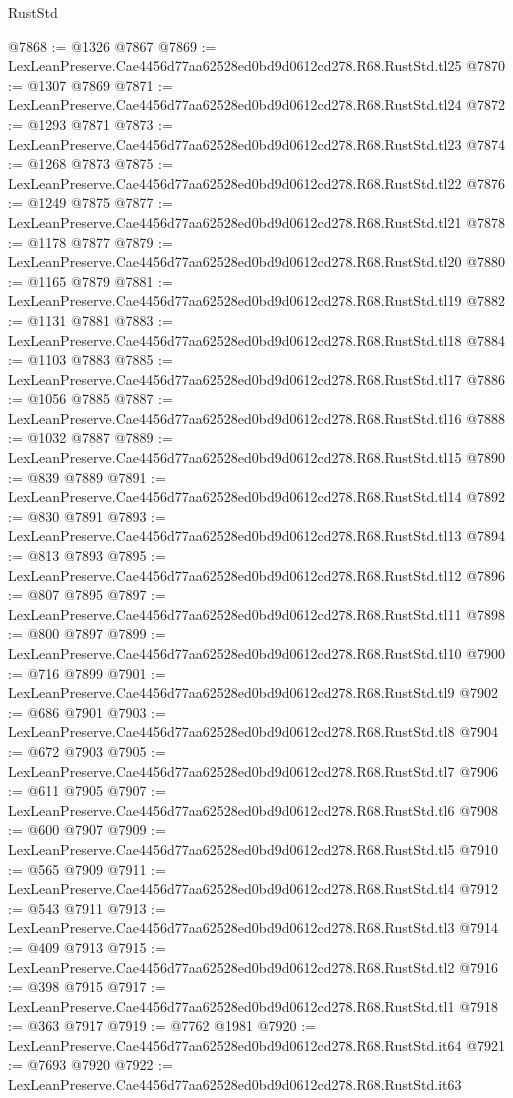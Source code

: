 \begin{lexlean}{RustStd}
\begin{coremodule}
@7868 := @1326 @7867
@7869 := LexLeanPreserve.Cae4456d77aa62528ed0bd9d0612cd278.R68.RustStd.tl25
@7870 := @1307 @7869
@7871 := LexLeanPreserve.Cae4456d77aa62528ed0bd9d0612cd278.R68.RustStd.tl24
@7872 := @1293 @7871
@7873 := LexLeanPreserve.Cae4456d77aa62528ed0bd9d0612cd278.R68.RustStd.tl23
@7874 := @1268 @7873
@7875 := LexLeanPreserve.Cae4456d77aa62528ed0bd9d0612cd278.R68.RustStd.tl22
@7876 := @1249 @7875
@7877 := LexLeanPreserve.Cae4456d77aa62528ed0bd9d0612cd278.R68.RustStd.tl21
@7878 := @1178 @7877
@7879 := LexLeanPreserve.Cae4456d77aa62528ed0bd9d0612cd278.R68.RustStd.tl20
@7880 := @1165 @7879
@7881 := LexLeanPreserve.Cae4456d77aa62528ed0bd9d0612cd278.R68.RustStd.tl19
@7882 := @1131 @7881
@7883 := LexLeanPreserve.Cae4456d77aa62528ed0bd9d0612cd278.R68.RustStd.tl18
@7884 := @1103 @7883
@7885 := LexLeanPreserve.Cae4456d77aa62528ed0bd9d0612cd278.R68.RustStd.tl17
@7886 := @1056 @7885
@7887 := LexLeanPreserve.Cae4456d77aa62528ed0bd9d0612cd278.R68.RustStd.tl16
@7888 := @1032 @7887
@7889 := LexLeanPreserve.Cae4456d77aa62528ed0bd9d0612cd278.R68.RustStd.tl15
@7890 := @839 @7889
@7891 := LexLeanPreserve.Cae4456d77aa62528ed0bd9d0612cd278.R68.RustStd.tl14
@7892 := @830 @7891
@7893 := LexLeanPreserve.Cae4456d77aa62528ed0bd9d0612cd278.R68.RustStd.tl13
@7894 := @813 @7893
@7895 := LexLeanPreserve.Cae4456d77aa62528ed0bd9d0612cd278.R68.RustStd.tl12
@7896 := @807 @7895
@7897 := LexLeanPreserve.Cae4456d77aa62528ed0bd9d0612cd278.R68.RustStd.tl11
@7898 := @800 @7897
@7899 := LexLeanPreserve.Cae4456d77aa62528ed0bd9d0612cd278.R68.RustStd.tl10
@7900 := @716 @7899
@7901 := LexLeanPreserve.Cae4456d77aa62528ed0bd9d0612cd278.R68.RustStd.tl9
@7902 := @686 @7901
@7903 := LexLeanPreserve.Cae4456d77aa62528ed0bd9d0612cd278.R68.RustStd.tl8
@7904 := @672 @7903
@7905 := LexLeanPreserve.Cae4456d77aa62528ed0bd9d0612cd278.R68.RustStd.tl7
@7906 := @611 @7905
@7907 := LexLeanPreserve.Cae4456d77aa62528ed0bd9d0612cd278.R68.RustStd.tl6
@7908 := @600 @7907
@7909 := LexLeanPreserve.Cae4456d77aa62528ed0bd9d0612cd278.R68.RustStd.tl5
@7910 := @565 @7909
@7911 := LexLeanPreserve.Cae4456d77aa62528ed0bd9d0612cd278.R68.RustStd.tl4
@7912 := @543 @7911
@7913 := LexLeanPreserve.Cae4456d77aa62528ed0bd9d0612cd278.R68.RustStd.tl3
@7914 := @409 @7913
@7915 := LexLeanPreserve.Cae4456d77aa62528ed0bd9d0612cd278.R68.RustStd.tl2
@7916 := @398 @7915
@7917 := LexLeanPreserve.Cae4456d77aa62528ed0bd9d0612cd278.R68.RustStd.tl1
@7918 := @363 @7917
@7919 := @7762 @1981
@7920 := LexLeanPreserve.Cae4456d77aa62528ed0bd9d0612cd278.R68.RustStd.it64
@7921 := @7693 @7920
@7922 := LexLeanPreserve.Cae4456d77aa62528ed0bd9d0612cd278.R68.RustStd.it63

\end{coremodule}
\end{lexlean}
